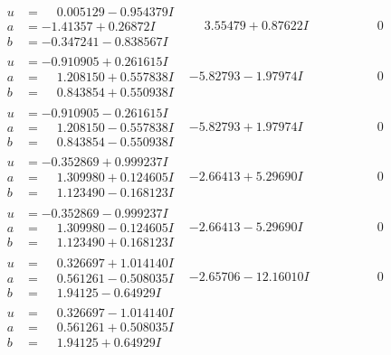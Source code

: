 \documentclass[1p]{elsarticle_modified}
\theoremstyle{definition}
\begin{document}
$$\begin{array}{c|c|c}
\begin{aligned}
u &= \phantom{-}0.005129 - 0.954379 I \\
a &= -1.41357 + 0.26872 I \\
b &= -0.347241 - 0.838567 I\end{aligned}
 & \phantom{-}3.55479 + 0.87622 I & \phantom{-0.000000 } 0 \\ \hline\begin{aligned}
u &= -0.910905 + 0.261615 I \\
a &= \phantom{-}1.208150 + 0.557838 I \\
b &= \phantom{-}0.843854 + 0.550938 I\end{aligned}
 & -5.82793 - 1.97974 I & \phantom{-0.000000 } 0 \\ \hline\begin{aligned}
u &= -0.910905 - 0.261615 I \\
a &= \phantom{-}1.208150 - 0.557838 I \\
b &= \phantom{-}0.843854 - 0.550938 I\end{aligned}
 & -5.82793 + 1.97974 I & \phantom{-0.000000 } 0 \\ \hline\begin{aligned}
u &= -0.352869 + 0.999237 I \\
a &= \phantom{-}1.309980 + 0.124605 I \\
b &= \phantom{-}1.123490 - 0.168123 I\end{aligned}
 & -2.66413 + 5.29690 I & \phantom{-0.000000 } 0 \\ \hline\begin{aligned}
u &= -0.352869 - 0.999237 I \\
a &= \phantom{-}1.309980 - 0.124605 I \\
b &= \phantom{-}1.123490 + 0.168123 I\end{aligned}
 & -2.66413 - 5.29690 I & \phantom{-0.000000 } 0 \\ \hline\begin{aligned}
u &= \phantom{-}0.326697 + 1.014140 I \\
a &= \phantom{-}0.561261 - 0.508035 I \\
b &= \phantom{-}1.94125 - 0.64929 I\end{aligned}
 & -2.65706 - 12.16010 I & \phantom{-0.000000 } 0 \\ \hline\begin{aligned}
u &= \phantom{-}0.326697 - 1.014140 I \\
a &= \phantom{-}0.561261 + 0.508035 I \\
b &= \phantom{-}1.94125 + 0.64929 I\end{aligned}

\end{array}$$
\end{document}
